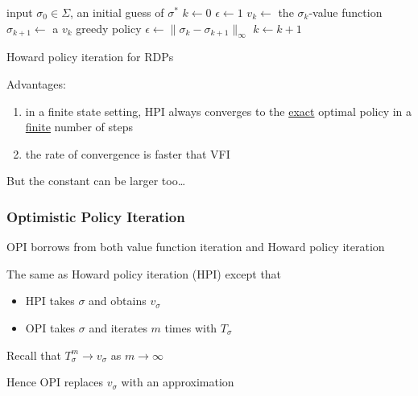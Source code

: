 \begin{frame}
        
    {\small
    \begin{algorithm}[H]
        \DontPrintSemicolon
        input $\sigma_0 \in \Sigma$, an initial guess of $\sigma^*$ \;
        $k \leftarrow 0$ \;
        $\epsilon \leftarrow 1$ \;
        {
            $v_k \leftarrow $ the $\sigma_k$-value function \;
            $\sigma_{k+1} \leftarrow $ a $v_k$ greedy policy \;
            $\epsilon \leftarrow \| \sigma_k - \sigma_{k+1} \|_\infty$ \;
            $k \leftarrow k + 1$ \;
        }
        \caption{\label{algo:fshpi} Howard policy iteration for RDPs}
    \end{algorithm}
    }

\end{frame}

\begin{frame}
    
    Advantages:
    \begin{enumerate}
        \item in a finite state setting, HPI always converges to the
            \underline{exact} optimal policy in a \underline{finite} number of steps
        \vspace{0.5em}
        \item the rate of convergence is faster that VFI 
    \end{enumerate}


        \vspace{0.5em}
      But the constant can be larger too\ldots

\end{frame}


\begin{frame}
    \frametitle{Optimistic Policy Iteration}

    OPI borrows from both value function iteration and Howard policy iteration

    \vspace{0.5em}
    The same as Howard policy iteration (HPI) except that
    \begin{itemize}
        \item HPI takes $\sigma$ and obtains $v_\sigma$
    \vspace{0.5em}
        \item OPI takes $\sigma$ and iterates $m$ times with $T_{\sigma}$
    \end{itemize}


    \vspace{0.5em}
    Recall that $T^m_{\sigma} \to v_\sigma$ as $m \to \infty$

    \vspace{0.5em}
    \vspace{0.5em}
    Hence OPI replaces $v_\sigma$ with an approximation

\end{frame}


